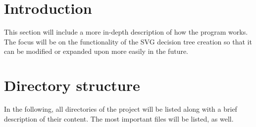 
\section{Introduction}
This section will include a more in-depth description of how the program works. The focus will be on the functionality of the SVG decision tree creation so that it can be modified or expanded upon more easily in the future.

\section{Directory structure}
In the following, all directories of the project will be listed along with a brief description of their content. The most important files will be listed, as well.

